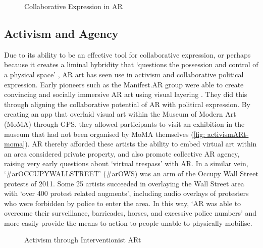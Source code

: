 \begin{figure}[ht]
    \centering
    \captionsetup{justification=centering}
    \hfill
    \caption{Collaborative Expression in AR}
    \label{fig: collaborativeARt}
\end{figure}

\subsection{Activism and Agency}\label{sec: ar-arts-activism}
Due to its ability to be an effective tool for collaborative expression, or perhaps because it creates a liminal hybridity that `questions the possession and control of a physical space' \citep{thiel2018}, AR art has seen use in activism and collaborative political expression. Early pioneers such as the Manifest.AR group were able to create convincing and socially immersive AR art using visual layering \citep{veenhof2010}. They did this through aligning the collaborative potential of AR with political expression. By creating an app that overlaid visual art within the Museum of Modern Art (MoMA) through GPS, they allowed participants to visit an exhibition in the museum that had not been organised by MoMA themselves (\autoref{fig: activismARt-moma}). AR thereby afforded these artists the ability to embed virtual art within an area considered private property, and also promote collective AR agency, raising very early questions about `virtual trespass' with AR. In a similar vein, `\#arOCCUPYWALLSTREET' (\#arOWS) was an arm of the Occupy Wall Street protests of 2011. Some 25 artists succeeded in overlaying the Wall Street area with `over 400 protest related augments', including audio overlays of protesters who were forbidden by police to enter the area. In this way, `AR was able to overcome their surveillance, barricades, horses, and excessive police numbers' \citeyearpar{skwarek2018} and more easily provide the means to action to people unable to physically mobilise.

\begin{figure}
    \centering
    \captionsetup{justification=centering}
    \hfill
    \caption{Activism through Interventionist ARt}
    \label{fig: activismARt}
\end{figure}

